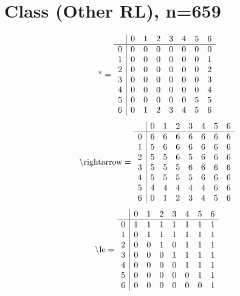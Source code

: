 \documentclass[11pt]{article}
\begin{document}
\section{Class (Other RL), n=659}
\[\text{*} = 
\begin{array}{r | r r r r r r r}
 & 0 & 1 & 2 & 3 & 4 & 5 & 6 \\ \hline
0 & 0 & 0 & 0 & 0 & 0 & 0 & 0 \\
1 & 0 & 0 & 0 & 0 & 0 & 0 & 1 \\
2 & 0 & 0 & 0 & 0 & 0 & 0 & 2 \\
3 & 0 & 0 & 0 & 0 & 0 & 0 & 3 \\
4 & 0 & 0 & 0 & 0 & 0 & 0 & 4 \\
5 & 0 & 0 & 0 & 0 & 0 & 5 & 5 \\
6 & 0 & 1 & 2 & 3 & 4 & 5 & 6 \\
\end{array}
\]
\[\text{\textbackslash rightarrow} = 
\begin{array}{r | r r r r r r r}
 & 0 & 1 & 2 & 3 & 4 & 5 & 6 \\ \hline
0 & 6 & 6 & 6 & 6 & 6 & 6 & 6 \\
1 & 5 & 6 & 6 & 6 & 6 & 6 & 6 \\
2 & 5 & 5 & 6 & 5 & 6 & 6 & 6 \\
3 & 5 & 5 & 5 & 6 & 6 & 6 & 6 \\
4 & 5 & 5 & 5 & 5 & 6 & 6 & 6 \\
5 & 4 & 4 & 4 & 4 & 4 & 6 & 6 \\
6 & 0 & 1 & 2 & 3 & 4 & 5 & 6 \\
\end{array}
\]
\[\text{\textbackslash le} = 
\begin{array}{r | r r r r r r r}
 & 0 & 1 & 2 & 3 & 4 & 5 & 6 \\ \hline
0 & 1 & 1 & 1 & 1 & 1 & 1 & 1 \\
1 & 0 & 1 & 1 & 1 & 1 & 1 & 1 \\
2 & 0 & 0 & 1 & 0 & 1 & 1 & 1 \\
3 & 0 & 0 & 0 & 1 & 1 & 1 & 1 \\
4 & 0 & 0 & 0 & 0 & 1 & 1 & 1 \\
5 & 0 & 0 & 0 & 0 & 0 & 1 & 1 \\
6 & 0 & 0 & 0 & 0 & 0 & 0 & 1 \\
\end{array}
\]
\end{document}
